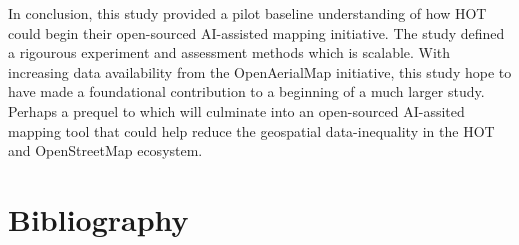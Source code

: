 \documentclass[11pt, a4paper, twoside]{report}
\begin{document}
In conclusion, this study provided a pilot baseline understanding of how HOT could begin their open-sourced AI-assisted mapping initiative. The study defined a rigourous experiment and assessment methods which is scalable. With increasing data availability from the OpenAerialMap initiative, this study hope to have made a foundational contribution to a beginning of a much larger study. Perhaps a prequel to which will culminate into an open-sourced AI-assited mapping tool that could help reduce the geospatial data-inequality in the HOT and OpenStreetMap ecosystem.\\\par

\newpage

\chapter{Bibliography}\label{Bib}
\end{document}
